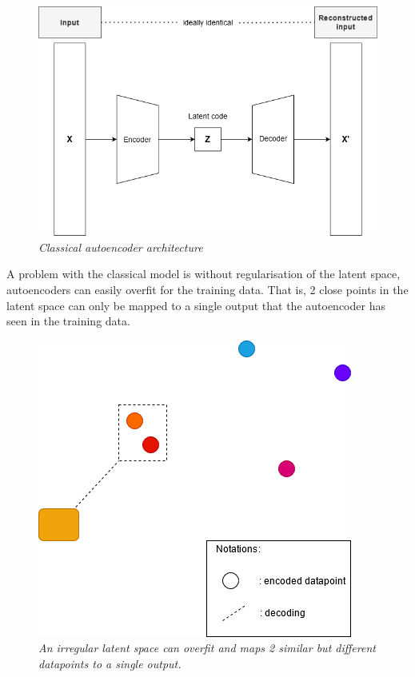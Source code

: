 \documentclass[12pt]{report}
\begin{document}
\begin{figure}[H]
	\centering
	\includegraphics[scale=0.7]{autoencoder-architecture}
	\caption{\textit{Classical autoencoder architecture \cite{autoencoder}}}
	\label{fig:autoencoder-architecture}
\end{figure}

A problem with the classical model is without regularisation of the latent space, autoencoders can easily overfit for the training data. That is, 2 close points in the latent space can only be mapped to a single output that the autoencoder has seen in the training data.

\begin{figure}[H]
	\centering
	\includegraphics[scale=0.7]{irregular-latent}
	\caption{\textit{An irregular latent space can overfit and maps 2 similar but different datapoints to a single output.}}
	\label{fig:irregular-latent}
\end{figure}
\end{document}

